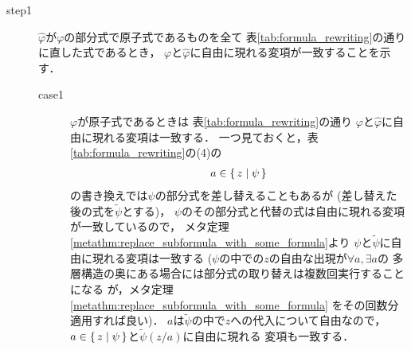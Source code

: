 	\begin{metaprf}\mbox{}
		\begin{description}
			\item[step1] $\widehat{\varphi}$が$\varphi$の部分式で原子式であるものを全て
				表\ref{tab:formula_rewriting}の通りに直した式であるとき，
				$\varphi$と$\widehat{\varphi}$に自由に現れる変項が一致することを示す．
				\begin{description}
					\item[case1] $\varphi$が原子式であるときは
						表\ref{tab:formula_rewriting}の通り
						$\varphi$と$\widehat{\varphi}$に自由に現れる変項は一致する．
						一つ見ておくと，表\ref{tab:formula_rewriting}の(4)の
						\begin{align}
							a \in \{\, z \mid \psi\, \}
						\end{align}
						の書き換えでは$\psi$の部分式を差し替えることもあるが
						(差し替えた後の式を$\widetilde{\psi}$とする)，
						$\psi$のその部分式と代替の式は自由に現れる変項が一致しているので，
						メタ定理\ref{metathm:replace_subformula_with_some_formula}より
						$\psi$と$\widetilde{\psi}$に自由に現れる変項は一致する
						($\psi$の中での$z$の自由な出現が$\forall a,\exists a$の
						多層構造の奥にある場合には部分式の取り替えは複数回実行することになる
						が，メタ定理\ref{metathm:replace_subformula_with_some_formula}
						をその回数分適用すれば良い)．
						$a$は$\widetilde{\psi}$の中で$z$への代入について自由なので，
						$a \in \{\, z \mid \psi\, \}$と$\tilde{\psi}(z/a)$に自由に現れる
						変項も一致する．
						

\end{description}
\end{description}
\end{metaprf}
